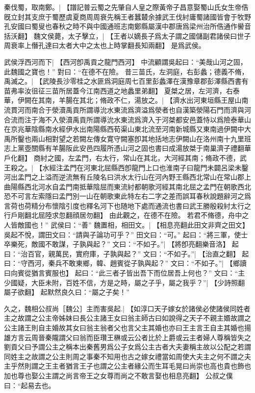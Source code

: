 秦伐蜀，取南鄭。|{
	【譜記普云蜀之先肇自人皇之際黃帝子昌意娶蜀山氏女生帝俈旣立封其支庶于蜀歷虞夏商周周衰先稱王者蠶樷余據武王伐紂庸蜀諸國皆會于牧野孔安國曰蜀叟也春秋之時不與中國通班志南鄭縣屬漢中郡唐爲梁州治所俈通作嚳音括沃翻】
	}
魏文侯薨，太子擊立，|{
	【王者以嫡長子爲太子謂之國儲副君諸侯曰世子周衰率上僭孔達曰太者大中之太也上時掌翻長知兩翻】}
是爲武侯。

武侯浮西河而下|{
	【西河卽禹貢之龍門西河】
	}
中流顧謂吳起曰：“美哉山河之固，此魏國之寶也！”
對曰：“在德不在險。
昔三苗氏，左洞庭，右彭蠡；德義不脩，禹滅之。|{
	【武陵長沙零桂之水匪爲洞庭周七百里彭蠡澤在漢豫章郡彭澤縣西書有苗弗率汝徂征三苗所居蓋今江南西道之地蠡里弟翻】}
夏桀之居，左河濟，右泰華，伊闕在其南，羊腸在其北；脩政不仁，湯放之。|{
	【濟水出河東垣縣王屋山南流貫河而南合于滎瀆禹貢所謂導沇水東流爲濟溢爲滎者也自漢築滎陽石門而濟與河合流而注于海不入滎瀆禹貢所謂導沇水東流爲濟入于河桀都安邑蓋恃以爲險泰華山在京兆華陰縣南水經伊水出南陽縣西荀渠山東北流至河南新城縣又東南過伊闕中大禹所鑿也兩山相對望之若闕左傳女寛守闕塞卽其地括地志伊闕山在洛州南十九里班志上黨壺關縣有羊腸阪此安邑四履所憑山河之固也書曰成湯放桀于南巢濟子禮翻華戶化翻】}
商紂之國，左孟門，右太行，常山在其北，大河經其南；脩政不德，武王殺之。|{
	【水經注孟門在河東北屈縣西卽龍門上口也淮南子曰龍門未闢呂梁未鑿河出孟門之上溢而逆流無有丘陵名曰洪水太行山在河內野王縣西北常山在常山郡上曲陽縣西北河水自孟門南抵華陰屈而東流紂都朝歌河經其南北屈之孟門在朝歌西北恐不可言左索隱曰孟門別一山在朝歌東此特左右二字之差而誤耳春秋說題辭河之爲言荷也荷精分布懷陰引度也釋名河下也随地下處而通流也書曰武王勝殷殺紂太行之行戶剛翻北屈陸求忽翻顔居勿翻】
	}
由此觀之，在德不在險。
若君不脩德，舟中之人皆敵國也！”
武侯曰：“善”
魏置相，相田文。|{
	【相息亮翻此田文非齊之田文】}
吳起不悅，謂田文曰：“請與子論功可乎？”
田文曰：“可。”
起曰：“將三軍，使士卒樂死，敵國不敢謀，子孰與起？”
文曰：“不如子。”|{
	【將卽亮翻樂音洛】}
起曰：“治百官，親萬民，實府庫，子孰與起？”
文曰：“不如子。”|{
	【治直之翻】
	}
起曰：“守西河，秦兵不敢東鄉，韓、趙賓從子孰與起？”
文曰：“不如子。”|{
	【鄉讀曰向賓從猶言賓服也】}
起曰：“此三者子皆出吾下而位居吾上何也？”
文曰：“主少國疑，大臣未附，百姓不信，方是之時，屬之子乎，屬之我乎？”|{
	【少詩照翻屬子欲翻】}
起默然良久曰：“屬之子矣！”

久之，魏相公叔尚［魏公］主而害吳起.|{
	【如淳口天子嫁女於諸侯必使諸侯同姓者主之故謂之公主帝姊妹曰長公主諸王女曰翁主師古曰如說得之天子不親主㛰故謂之公主諸王則自主婚故其女曰翁主翁者父也言父主其婚也亦曰王主言王自主其婚也揚雄方言云周晉秦隴謂父曰翁而臣瓚王楙或云公者比於上爵或云主者婦人尊稱皆失之劉貢父曰予謂公主之稱本出秦舊男爲公子女爲公主古者大夫妻稱主故以公配之若謂同姓主之故謂之公主則周之事秦不知用也古之嫁女禮當如周使大夫主之何不謂之夫主乎然則謂之王主者猶言王子也謂之公主者緣公而生耳毛晃曰尚崇也高也貴也飾也加也尊也娶公主謂之尚言帝王之女尊而尚之不敢言娶也相息亮翻】
	}
公叔之僕曰：“起易去也。



